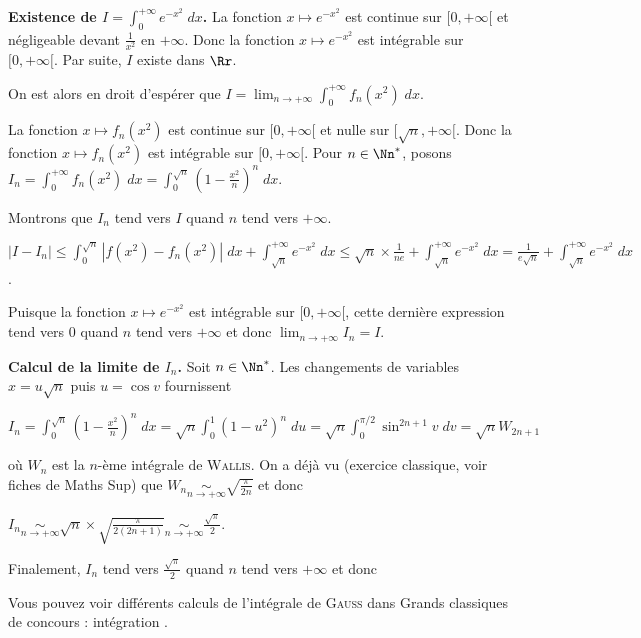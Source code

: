 {\begin{enumerate}
{\item  \textbf{Existence de $I=\int_{0}^{+\infty}e^{-x^2}\;dx$.} La fonction $x\mapsto e^{-x^2}$ est continue sur $[0,+\infty[$ et négligeable devant $\frac{1}{x^2}$ en $+\infty$. Donc la fonction $x\mapsto e^{-x^2}$  est intégrable sur $[0,+\infty[$. Par suite, $I$ existe dans $\Rr$.

On est alors en droit d'espérer que $I=\lim_{n \rightarrow +\infty}\int_{0}^{+\infty}f_n(x^2)\;dx$.

La fonction $x\mapsto f_n(x^2)$ est continue sur $[0,+\infty[$ et nulle sur $[\sqrt{n},+\infty[$. Donc la fonction $x\mapsto f_n(x^2)$ est intégrable sur $[0,+\infty[$. Pour $n\in\Nn^*$, posons $I_n=\int_{0}^{+\infty}f_n(x^2)\;dx=\int_{0}^{\sqrt{n}}\left(1-\frac{x^2}{n}\right)^n\;dx$.

Montrons que $I_n$ tend vers $I$ quand $n$ tend vers $+\infty$.

\begin{center}
$|I-I_n|\leqslant\int_{0}^{\sqrt{n}}|f(x^2)-f_n(x^2)|\;dx+\int_{\sqrt{n}}^{+\infty}e^{-x^2}\;dx\leqslant\sqrt{n}\times\frac{1}{ne}+\int_{\sqrt{n}}^{+\infty}e^{-x^2}\;dx=\frac{1}{e\sqrt{n}}+\int_{\sqrt{n}}^{+\infty}e^{-x^2}\;dx$.
\end{center}

Puisque la fonction $x\mapsto e^{-x^2}$ est intégrable sur $[0,+\infty[$, cette dernière expression tend vers $0$ quand $n$ tend vers $+\infty$ et donc $\lim_{n \rightarrow +\infty}I_n=I$.

\textbf{Calcul de la limite de $I_n$.} Soit $n\in\Nn^*$. Les changements de variables $x = u\sqrt{n}$  puis $u =\cos v$ fournissent

\begin{center}
$I_n =\int_{0}^{\sqrt{n}}\left(1-\frac{x^2}{n}\right)^n\;dx=\sqrt{n}\int_{0}^{1}(1-u^2)^n\;du =\sqrt{n}\int_{0}^{\pi/2}\sin^{2n+1}v\;dv =\sqrt{n}W_{2n+1}$
\end{center}

où $W_n$ est la $n$-ème intégrale de \textsc{Wallis}. On a déjà vu (exercice classique, voir fiches de Maths Sup) que $W_n\underset{n\rightarrow+\infty}{\sim}\sqrt{\frac{\pi}{2n}}$ et donc 

\begin{center}
$I_n\underset{n\rightarrow+\infty}{\sim}\sqrt{n}\times\sqrt{\frac{\pi}{2(2n+1)}}\underset{n\rightarrow+\infty}{\sim}\frac{\sqrt{\pi}}{2}$.
\end{center}

Finalement, $I_n$ tend vers $\frac{\sqrt{\pi}}{2}$ quand $n$ tend vers $+\infty$ et donc 

\begin{center}
\end{center}

Vous pouvez voir différents calculs de l'intégrale de \textsc{Gauss} dans \og Grands classiques de concours : intégration \fg.
}
\end{enumerate}
}
